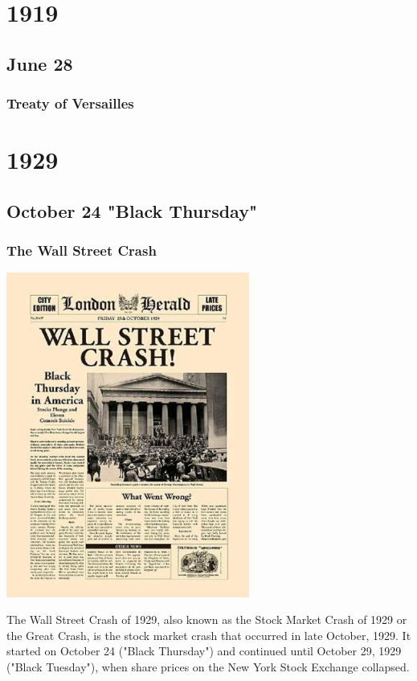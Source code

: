 \documentclass[11pt]{report}
\begin{document}
\chapter{1919}
\section{June 28}
\subsection{Treaty of Versailles}

\chapter{1929}
\section{October 24 "Black Thursday"}
\subsection{The Wall Street Crash}
\vspace{2mm}\begin{center}\includegraphics[width=8cm]{./img/wallStreetCrash.jpg}\end{center}
The Wall Street Crash of 1929, also known as the Stock Market Crash of 1929 or the Great Crash, is the stock market crash that occurred in late October, 1929. It started on October 24 ("Black Thursday") and continued until October 29, 1929 ("Black Tuesday"), when share prices on the New York Stock Exchange collapsed.
\end{document}
